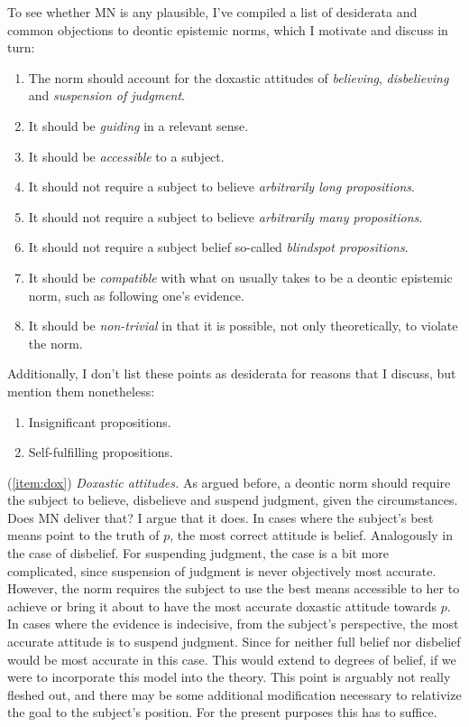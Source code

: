 \documentclass[12pt,numbers=noenddot]{scrartcl}
\begin{document}
To see whether MN is any plausible, I've compiled a list of desiderata and common objections to deontic epistemic norms, which I motivate and discuss in turn:
\begin{enumerate}
    \itemsep-0.2em
    \item \label{item:dox} The norm should account for the doxastic attitudes of \emph{believing}, \emph{disbelieving} and \emph{suspension of judgment}.
    \item \label{item:guiding} It should be \emph{guiding} in a relevant sense.
    \item \label{item:accessible}It should be \emph{accessible} to a subject.
    \item \label{item:arbitrarilylong}It should not require a subject to believe \emph{arbitrarily long propositions}.
    \item \label{item:arbitrarilymany}It should not require a subject to believe \emph{arbitrarily many propositions}.
    \item \label{item:blindspot}It should not require a subject belief so-called \emph{blindspot propositions}.
    \item \label{item:compatible}It should be \emph{compatible} with what on usually takes to be a deontic epistemic norm, such as following one's evidence.
    \item \label{item:nontrivial}It should be \emph{non-trivial} in that it is possible, not only theoretically, to violate the norm.
\end{enumerate}

Additionally, I don't list these points as desiderata for reasons that I discuss, but mention them nonetheless:
\begin{enumerate}[label=(\roman*)]
    \itemsep-0.2em
    \item \label{item:insignificant}Insignificant propositions.
    \item \label{item:self-fulfilling}Self-fulfilling propositions.
\end{enumerate}

(\ref{item:dox}) \emph{Doxastic attitudes.} 
As argued before, a deontic norm should require the subject to believe, disbelieve and suspend judgment, given the circumstances. Does MN deliver that? I argue that it does. In cases where the subject's best means point to the truth of $p$, the most correct attitude is belief. Analogously in the case of disbelief. For suspending judgment, the case is a bit more complicated, since suspension of judgment is never objectively most accurate. However, the norm requires the subject to use the best means accessible to her to achieve or bring it about to have the most accurate doxastic attitude towards $p$. In cases where the evidence is indecisive, from the subject's perspective, the most accurate attitude is to suspend judgment. Since for neither full belief nor disbelief would be most accurate in this case. This would extend to degrees of belief, if we were to incorporate this model into the theory. This point is arguably not really fleshed out, and there may be some additional modification necessary to relativize the goal to the subject's position. For the present purposes this has to suffice.
\end{document}
